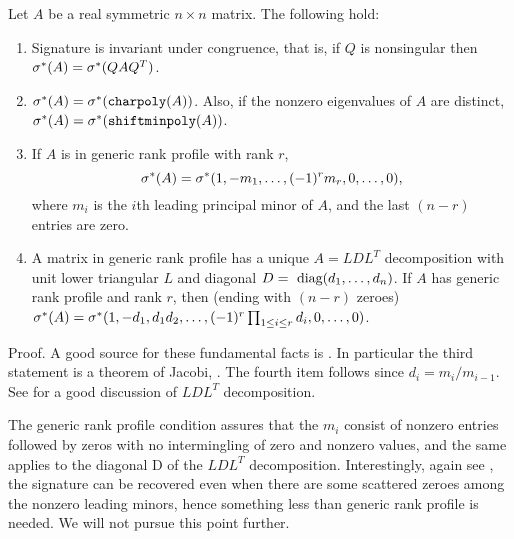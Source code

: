 \documentclass{sig-alternate}
\begin{document}
\begin{theorem} {\label{theorem:sig}}
Let $A$ be a real symmetric $n\times n$ matrix.
The following hold:
\begin{enumerate}
\item 
Signature is invariant under congruence, that is, if 
$Q$ is nonsingular then $\sigma^{*}(A) = \sigma^{*}(QAQ^T)$.
\item
$\sigma^{*}(A) = \sigma^{*}(\mbox{\tt charpoly}(A))$.
Also, if the nonzero eigenvalues of $A$ are distinct,
$\sigma^{*}(A) = \sigma^{*}(\mbox{\tt shiftminpoly}(A))$.
\item
If $A$ is in generic rank profile with rank $r$, 
$$\sigma^{*}(A) = \sigma^{*}(1, -m_1, \ldots, (-1)^r m_r, 0, \ldots, 0),$$
where $m_i$ is the $i$th leading principal minor of $A$, and the last $(n-r)$
entries are zero.
\item
A matrix in generic rank profile has a unique $A = LDL^T$ decomposition with 
unit lower triangular $L$ and diagonal $D = \mbox{ diag}(d_1, \ldots, d_n)$.  If $A$
has generic rank profile and rank $r$, then (ending with $(n-r)$ zeroes)\\
$\sigma^{*}(A) = 
\sigma^{*}(1, -d_1, d_1 d_2, \ldots, (-1)^r\prod_{1 \leq i \leq r}d_i, 0, \ldots, 0)$. 
\end{enumerate}
\end{theorem}

Proof.  A good source for these fundamental facts is \cite{gantmacher}.
In particular the third statement is a theorem of Jacobi, \cite[Chapter X, \S 3, theorem 2]{gantmacher}.
The fourth item follows since $d_i = m_i/m_{i-1}$.
See \cite[Chapter 4]{GoLo96} for a good discussion of $LDL^T$ decomposition.
\QED

The generic rank profile condition assures that the $m_i$ consist of nonzero entries followed
by zeros with no intermingling of zero and nonzero values, and the same applies to the 
diagonal D of the $LDL^T$ decomposition.
Interestingly, again see \cite{gantmacher}, the 
signature can be recovered even when there are some scattered zeroes among the nonzero 
leading minors, hence something less than generic rank profile is needed.  
We will not pursue this point further. 


\end{document}
